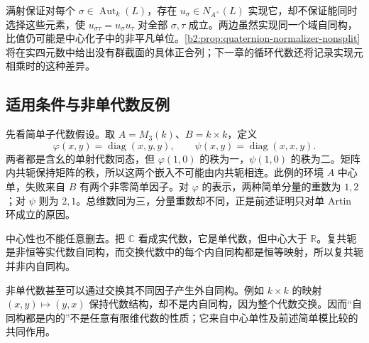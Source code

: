 满射保证对每个 \(\sigma\in\operatorname{Aut}_k(L)\)，存在 \(u_\sigma\in N_{A^\times}(L)\) 实现它，却不保证能同时选择这些元素，使 \(u_{\sigma\tau}=u_\sigma u_\tau\) 对全部 \(\sigma,\tau\) 成立。两边虽然实现同一个域自同构，比值仍可能是中心化子中的非平凡单位。\cref{b2:prop:quaternion-normalizer-nonsplit}将在实四元数中给出没有群截面的具体正合列；下一章的循环代数还将记录实现元相乘时的这种差异。

\subsection{适用条件与非单代数反例}
\label{b2:subsec:1703:03}

先看简单子代数假设。取 \(A=M_3(k)\)、\(B=k\times k\)，定义
\[
	\varphi(x,y)=\operatorname{diag}(x,y,y),\qquad \psi(x,y)=\operatorname{diag}(x,x,y).
\]
两者都是含幺的单射代数同态，但 \(\varphi(1,0)\) 的秩为一，\(\psi(1,0)\) 的秩为二。矩阵内共轭保持矩阵的秩，所以这两个嵌入不可能由内共轭相连。此例的环境 \(A\) 中心单，失败来自 \(B\) 有两个非零简单因子。对 \(\varphi\) 的表示，两种简单分量的重数为 \(1,2\)；对 \(\psi\) 则为 \(2,1\)。总维数同为三，分量重数却不同，正是前述证明只对单 Artin 环成立的原因。

\ProseParagraphBreak
中心性也不能任意删去。把 \(\mathbb C\) 看成实代数，它是单代数，但中心大于 \(\mathbb R\)。复共轭是非恒等实代数自同构，而交换代数中的每个内自同构都是恒等映射，所以复共轭并非内自同构。

\ProseParagraphBreak
非单代数甚至可以通过交换其不同因子产生外自同构。例如 \(k\times k\) 的映射 \((x,y)\mapsto(y,x)\) 保持代数结构，却不是内自同构，因为整个代数交换。因而“自同构都是内的”不是任意有限维代数的性质；它来自中心单性及前述简单模比较的共同作用。
